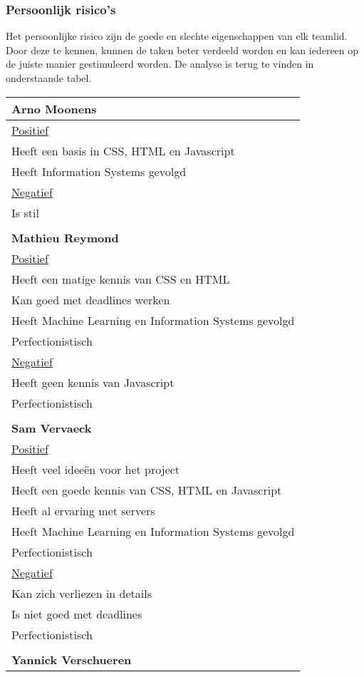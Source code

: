 \subsubsection{Persoonlijk risico's}
Het persoonlijke risico zijn de goede en slechte eigenschappen van elk teamlid. Door deze te kennen, kunnen de taken beter verdeeld worden en kan iedereen op de juiste manier gestimuleerd worden. De analyse is terug te vinden in onderstaande tabel. 
\begin{longtable}{l}
 \textbf{Arno Moonens}  \\
 \hline
  \underline{Positief} \\ 
  Heeft een basis in CSS, HTML en Javascript \\
  Heeft Information Systems gevolgd \\
  \underline{Negatief} \\
  Is stil \\
\\
  \textbf{Mathieu Reymond} \\
  \hline
  \underline{Positief} \\
  Heeft een matige kennis van CSS en HTML \\
  Kan goed met deadlines werken \\
  Heeft Machine Learning en Information Systems gevolgd \\
  Perfectionistisch \\
  \underline{Negatief} \\
  Heeft geen kennis van Javascript \\
  Perfectionistisch \\
  \\
  \textbf{Sam Vervaeck} \\
  \hline 
  \underline{Positief} \\
  Heeft veel ideeën voor het project \\
  Heeft een goede kennis van CSS, HTML en Javascript \\
  Heeft al ervaring met servers \\
  Heeft Machine Learning en Information Systems gevolgd \\
  Perfectionistisch \\
  \underline{Negatief} \\
  Kan zich verliezen in details \\
  Is niet goed met deadlines \\
  Perfectionistisch \\  
   \\
  \textbf{Yannick Verschueren} \\

\end{longtable}
